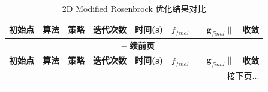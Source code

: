 \documentclass[a4paper,12pt]{article}
\begin{document}
{
\small %
\setlength{\tabcolsep}{4pt} %

\begin{longtable}{llccrrrc}
    \caption{2D Modified Rosenbrock 优化结果对比} \label{tab:res_2d} \\

    \toprule
    \textbf{初始点} & \textbf{算法} & \textbf{策略} & \textbf{迭代次数} & \textbf{时间(s)} & \textbf{$f_{final}$} & \textbf{$\|\bm{g}_{final}\|$} & \textbf{收敛} \\
    \midrule
    \endfirsthead

    \multicolumn{8}{c}{{\bfseries \tablename\ \thetable{} -- 续前页}} \\ %
    \toprule
    \textbf{初始点} & \textbf{算法} & \textbf{策略} & \textbf{迭代次数} & \textbf{时间(s)} & \textbf{$f_{final}$} & \textbf{$\|\bm{g}_{final}\|$} & \textbf{收敛} \\
    \midrule
    \endhead

    \midrule
    \multicolumn{8}{r}{{接下页...}} \\
    \endfoot

    \bottomrule
    \endlastfoot


\end{longtable}}
\end{document}
